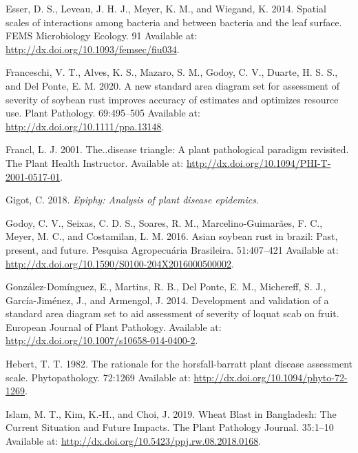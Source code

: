 \documentclass[
  letterpaper,
]{book}
\newlength{\cslhangindent}
\newlength{\cslentryspacingunit} %
\newenvironment{CSLReferences}[2] %
 {%
  \setlength{\parindent}{0pt}
  \ifodd #1
  \let\oldpar\par
  \def\par{\hangindent=\cslhangindent\oldpar}
  \fi
  \setlength{\parskip}{#2\cslentryspacingunit}
 }%
 {}
\begin{document}
\begin{CSLReferences}{0}{0}
\leavevmode{}%
Esser, D. S., Leveau, J. H. J., Meyer, K. M., and Wiegand, K. 2014.
Spatial scales of interactions among bacteria and between bacteria and
the leaf surface. FEMS Microbiology Ecology. 91 Available at:
\url{http://dx.doi.org/10.1093/femsec/fiu034}.

\leavevmode{}%
Franceschi, V. T., Alves, K. S., Mazaro, S. M., Godoy, C. V., Duarte, H.
S. S., and Del Ponte, E. M. 2020. A new standard area diagram set for
assessment of severity of soybean rust improves accuracy of estimates
and optimizes resource use. Plant Pathology. 69:495--505 Available at:
\url{http://dx.doi.org/10.1111/ppa.13148}.

\leavevmode{}%
Francl, L. J. 2001. The..disease triangle: A plant pathological paradigm
revisited. The Plant Health Instructor. Available at:
\url{http://dx.doi.org/10.1094/PHI-T-2001-0517-01}.

\leavevmode{}%
Gigot, C. 2018. \emph{Epiphy: Analysis of plant disease epidemics}.

\leavevmode{}%
Godoy, C. V., Seixas, C. D. S., Soares, R. M., Marcelino-Guimarães, F.
C., Meyer, M. C., and Costamilan, L. M. 2016. Asian soybean rust in
brazil: Past, present, and future. Pesquisa Agropecuária Brasileira.
51:407--421 Available at:
\url{http://dx.doi.org/10.1590/S0100-204X2016000500002}.

\leavevmode{}%
González-Domínguez, E., Martins, R. B., Del Ponte, E. M., Michereff, S.
J., García-Jiménez, J., and Armengol, J. 2014. Development and
validation of a standard area diagram set to aid assessment of severity
of loquat scab on fruit. European Journal of Plant Pathology. Available
at: \url{http://dx.doi.org/10.1007/s10658-014-0400-2}.

\leavevmode{}%
Hebert, T. T. 1982. The rationale for the horsfall-barratt plant disease
assessment scale. Phytopathology. 72:1269 Available at:
\url{http://dx.doi.org/10.1094/phyto-72-1269}.

\leavevmode{}%
Islam, M. T., Kim, K.-H., and Choi, J. 2019. Wheat Blast in Bangladesh:
The Current Situation and Future Impacts. The Plant Pathology Journal.
35:1--10 Available at:
\url{http://dx.doi.org/10.5423/ppj.rw.08.2018.0168}.


\end{CSLReferences}
\end{document}
